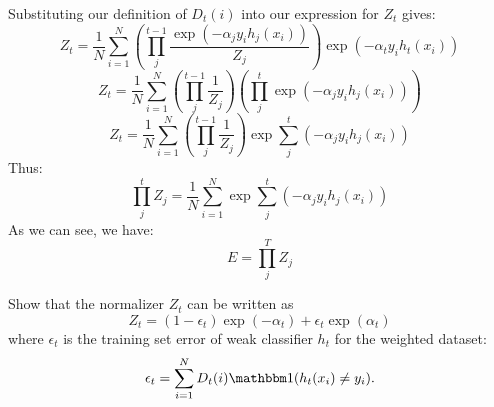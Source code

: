 \begin{solution}
    Substituting our definition of $D_t(i)$ into our expression for $Z_t$ gives:
    \begin{equation}
        Z_t = \frac{1}{N}\sum\limits_{i=1}^N \left(\prod_j^{t-1}\frac{\exp{(-\alpha_jy_ih_j(x_i))}}{Z_j}\right)\exp(-\alpha_{t}y_{i}h_{t}(x_{i}))
    \end{equation}
    \begin{equation}
        Z_t = \frac{1}{N}\sum\limits_{i=1}^N \left(\prod_j^{t-1}\frac{1}{Z_j}\right)\left(\prod_j^{t}\exp{(-\alpha_jy_ih_j(x_i))}\right)
    \end{equation}
    \begin{equation}
        Z_t = \frac{1}{N}\sum\limits_{i=1}^N \left(\prod_j^{t-1}\frac{1}{Z_j}\right)\exp{\sum_j^t\left(-\alpha_jy_ih_j(x_i)\right)}
    \end{equation}
    Thus:
    \begin{equation}
        \prod_j^{t}Z_j=\frac{1}{N}\sum\limits_{i=1}^N\exp{\sum_j^t\left(-\alpha_jy_ih_j(x_i)\right)}
    \end{equation}
    As we can see, we have:
    \begin{equation}
        E = \prod_j^{T}Z_j
    \end{equation}
\end{solution}

\problem[5]
Show that the normalizer $Z_t$ can be written as
\[Z_t = (1 - \epsilon_t) \exp(-\alpha_t) + \epsilon_{t} \exp(\alpha_t)\]
where $\epsilon_t$ is the training set error of weak classifier $h_t$ for the weighted dataset:
\[\epsilon_t = \sum\limits_{i=1}^N D_t(i)\mathbbm1(h_t(x_i) \neq y_i).\]

